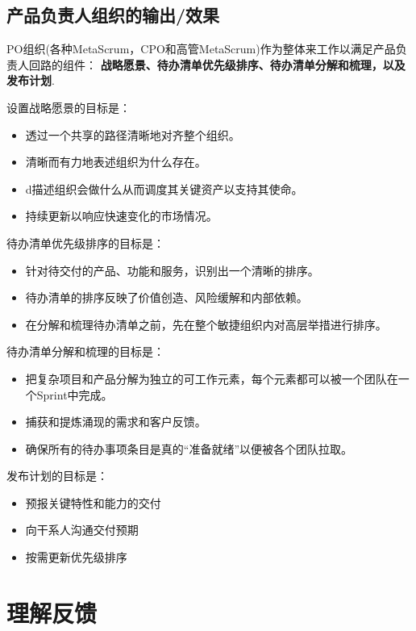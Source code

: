 \documentclass[12pt,a4paper,parskip=full]{scrartcl}
\begin{document}
\begin{CJK*}{UTF8}{gbsn}
\subsection{产品负责人组织的输出/效果}
PO组织(各种MetaScrum，CPO和高管MetaScrum)作为整体来工作以满足产品负责人回路的组件： \textbf{战略愿景、待办清单优先级排序、待办清单分解和梳理，以及发布计划}.

设置战略愿景的目标是：

\begin{itemize}
\item 透过一个共享的路径清晰地对齐整个组织。
\item 清晰而有力地表述组织为什么存在。
\item d描述组织会做什么从而调度其关键资产以支持其使命。
\item 持续更新以响应快速变化的市场情况。
\end{itemize}
待办清单优先级排序的目标是：
\begin{itemize}
\item 针对待交付的产品、功能和服务，识别出一个清晰的排序。
\item 待办清单的排序反映了价值创造、风险缓解和内部依赖。
\item 在分解和梳理待办清单之前，先在整个敏捷组织内对高层举措进行排序。
\end{itemize}
待办清单分解和梳理的目标是：
\begin{itemize}
\item 把复杂项目和产品分解为独立的可工作元素，每个元素都可以被一个团队在一个Sprint中完成。
\item 捕获和提炼涌现的需求和客户反馈。
\item 确保所有的待办事项条目是真的“准备就绪”以便被各个团队拉取。
\end{itemize}
发布计划的目标是：
\begin{itemize}
\item 预报关键特性和能力的交付
\item 向干系人沟通交付预期
\item 按需更新优先级排序
\end{itemize}

\section{理解反馈}


\end{CJK*}
\end{document}
